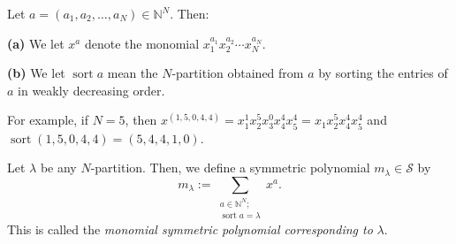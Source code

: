 \begin{definition}
\label{def.sf.sort}Let $a=\left(  a_{1},a_{2},\ldots,a_{N}\right)
\in\mathbb{N}^{N}$. Then: \medskip

\textbf{(a)} We let $x^{a}$ denote the monomial $x_{1}^{a_{1}}x_{2}^{a_{2}%
}\cdots x_{N}^{a_{N}}$. \medskip

\textbf{(b)} We let $\operatorname*{sort}a$ mean the $N$-partition obtained
from $a$ by sorting the entries of $a$ in weakly decreasing order.
\end{definition}

For example, if $N=5$, then $x^{\left(  1,5,0,4,4\right)  }=x_{1}^{1}x_{2}%
^{5}x_{3}^{0}x_{4}^{4}x_{5}^{4}=x_{1}x_{2}^{5}x_{4}^{4}x_{5}^{4}$ and
\newline$\operatorname*{sort}\left(  1,5,0,4,4\right)  =\left(
5,4,4,1,0\right)  $.

\begin{definition}
\label{def.sf.m}Let $\lambda$ be any $N$-partition. Then, we define a
symmetric polynomial $m_{\lambda}\in\mathcal{S}$ by%
\[
m_{\lambda}:=\sum_{\substack{a\in\mathbb{N}^{N};\\\operatorname*{sort}%
a=\lambda}}x^{a}.
\]
This is called the \emph{monomial symmetric polynomial corresponding to
}$\lambda$.
\end{definition}

